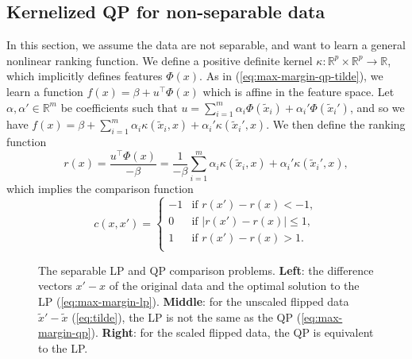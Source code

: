\documentclass{article}
\newcommand{\RR}{\mathbb R}
\begin{document}
\subsection{Kernelized QP for non-separable data}
\label{sec:kernelized-qp}
In this section, we assume the data are not separable, and want to
learn a general nonlinear ranking function. We define a positive
definite kernel $\kappa:\RR^p\times \RR^p\rightarrow\RR$, which
implicitly defines features $\Phi(x)$. As in
(\ref{eq:max-margin-qp-tilde}), we learn a function $f(x)=\beta +
u^\intercal \Phi(x)$ which is affine in the feature space. Let
$\alpha,\alpha'\in\RR^m$ be coefficients such that $u=\sum_{i=1}^m
\alpha_i \Phi(\tilde x_i) + \alpha_i' \Phi(\tilde x_i')$, and so we
have
 $f(x) =\beta + \sum_{i=1}^m \alpha_i \kappa(\tilde x_i, x) +
\alpha_i' \kappa(\tilde x_i', x)$. We then 
define the ranking function
\begin{equation}
  \label{eq:kernelized_r}
  r(x)= \frac{u^\intercal \Phi(x)}{-\beta} = \frac{1}{-\beta}
  \sum_{i=1}^m
    \alpha_i \kappa(\tilde x_i, x) + \alpha_i'  \kappa(\tilde x_i', x) 
  ,
\end{equation}
which implies the comparison function
\begin{equation}
  \label{eq:kernelized_c}
  c(x, x') =
  \begin{cases}
    -1 & \text{if } r(x') - r(x) < -1, \\
    0 & \text{if } |r(x') - r(x)| \leq 1, \\
    1 & \text{if } r(x') - r(x) > 1. \\
  \end{cases}
\end{equation}

\begin{figure*}
  \centering
  
  \vskip -0.5cm
  \caption{The separable LP and QP comparison problems. \textbf{Left}:
    the difference vectors $x'-x$ of the original data and the optimal
    solution to the LP (\ref{eq:max-margin-lp}). \textbf{Middle}: for
    the unscaled flipped data $\tilde x'-\tilde x$ (\ref{eq:tilde}),
    the LP is not the same as the QP
    (\ref{eq:max-margin-qp}). \textbf{Right}: for the scaled flipped
    data, the QP is equivalent to the LP.}
  \label{fig:hard-margin}
\end{figure*}
\end{document}
